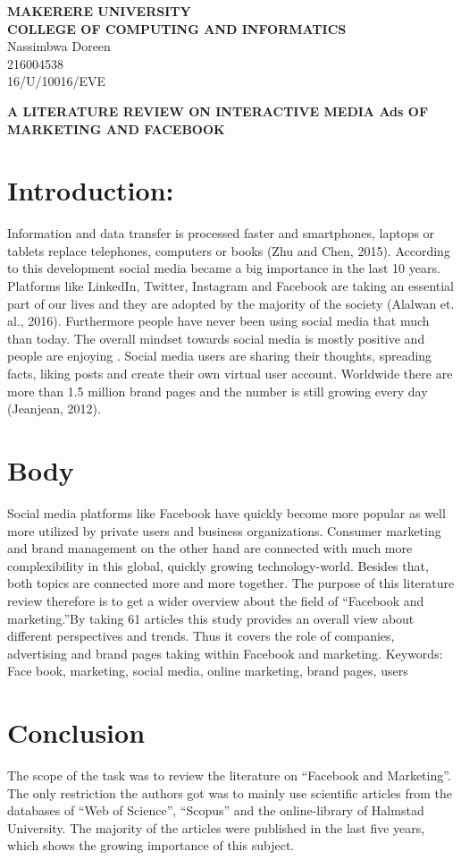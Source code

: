 \documentclass[11pt]{article}
\begin{document}
\begin{titlepage}
\textbf{MAKERERE UNIVERSITY\\COLLEGE OF COMPUTING AND INFORMATICS\\}
{ Nassimbwa Doreen\\ 216004538\\ 16/U/10016/EVE}

\end{titlepage}
\newpage

\textbf{A LITERATURE REVIEW ON INTERACTIVE MEDIA Ads OF MARKETING AND FACEBOOK}


\section{Introduction:}
Information and data transfer is processed faster and smartphones, laptops or tablets replace telephones, computers or books (Zhu and Chen, 2015). According to this development social media became a big importance in the last 10 years. Platforms like LinkedIn, Twitter, Instagram and Facebook are taking an essential part of our lives and they are adopted by the majority of the society (Alalwan et. al., 2016). Furthermore people have never been using social media that much than today. The overall mindset towards social media is mostly positive and people are enjoying \cite{montgomery2009interactive}. Social media users are sharing their thoughts, spreading facts, liking posts and create their own virtual user account. Worldwide there are more than 1.5 million brand pages and the number is still growing every day (Jeanjean, 2012).
\section{Body}
Social media platforms like Facebook have quickly become more popular as well more utilized by private users and business organizations. Consumer marketing and brand management on the other hand are connected with much more complexibility in this global, quickly growing technology-world. Besides that, both topics are connected more and more together. The purpose of this literature review therefore is to get a wider overview about the field of “Facebook and marketing.”By taking 61 articles \cite{de2012popularity}this study provides an overall view about different perspectives and trends. Thus it covers the role of companies, advertising and brand pages taking within Facebook and marketing.
Keywords: Face book, marketing, social media, online marketing, brand pages, users\cite{kirtics2011or}
\section{Conclusion}
The scope of the task was to review the literature on “Facebook and Marketing”. The only restriction the authors got was to mainly use scientific articles from the databases of “Web of Science”, “Scopus” and the online-library of Halmstad\cite{vanboskirk2011us} University. The majority of the articles were published in the last five years, which shows the growing importance of this subject.
\newpage


\end{document}
